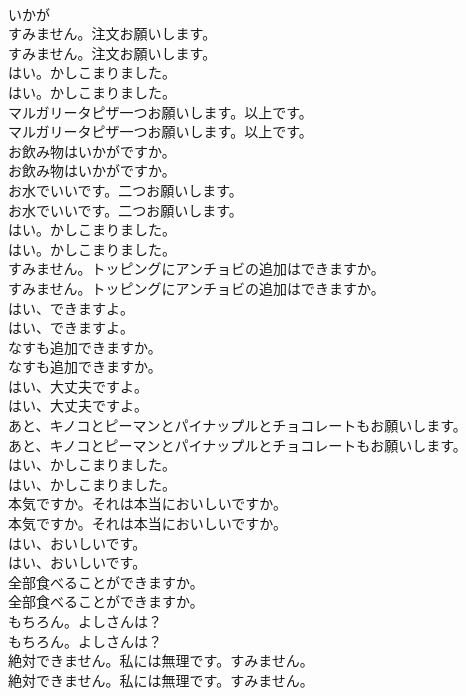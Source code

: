 \documentclass[8pt]{extreport}
\begin{document}
\begin{CJK}{UTF8}{min}
\\	いかが
\\	すみません。注文お願いします。	
\\	すみません。注文お願いします。 
\\	はい。かしこまりました。	
\\	はい。かしこまりました。 
\\	マルガリータピザ一つお願いします。以上です。	
\\	マルガリータピザ一つお願いします。以上です。 
\\	お飲み物はいかがですか。	
\\	お飲み物はいかがですか。 
\\	お水でいいです。二つお願いします。	
\\	お水でいいです。二つお願いします。 
\\	はい。かしこまりました。	
\\	はい。かしこまりました。 
\\	すみません。トッピングにアンチョビの追加はできますか。	
\\	すみません。トッピングにアンチョビの追加はできますか。 
\\	はい、できますよ。	
\\	はい、できますよ。 
\\	なすも追加できますか。	
\\	なすも追加できますか。 
\\	はい、大丈夫ですよ。	
\\	はい、大丈夫ですよ。 
\\	あと、キノコとピーマンとパイナップルとチョコレートもお願いします。	
\\	あと、キノコとピーマンとパイナップルとチョコレートもお願いします。 
\\	はい、かしこまりました。	
\\	はい、かしこまりました。 
\\	本気ですか。それは本当においしいですか。	
\\	本気ですか。それは本当においしいですか。 
\\	はい、おいしいです。	
\\	はい、おいしいです。 
\\	全部食べることができますか。	
\\	全部食べることができますか。 
\\	もちろん。よしさんは？	
\\	もちろん。よしさんは？ 
\\	絶対できません。私には無理です。すみません。	
\\	絶対できません。私には無理です。すみません。 

\end{CJK}
\end{document}
